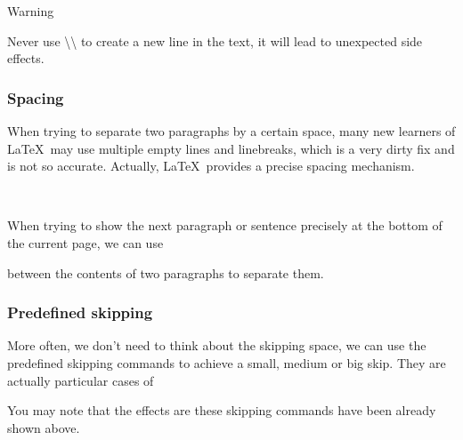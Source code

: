 \begin{frame}{Warning}
    \begin{warning}
        Never use \alert{\textbackslash\textbackslash} to create a new line in the text, it will lead to unexpected side effects.
    \end{warning}
  \end{frame}

\begin{frame}[fragile]
    \frametitle{Spacing}
    When trying to separate two paragraphs by a certain space, many new learners of \LaTeX\ may use multiple empty lines and linebreaks, which is a very dirty fix and is not so accurate. Actually, \LaTeX\ provides a precise spacing mechanism.
    \begin{command}
        \LC{\vspace{space}}\\
        \LC{\vspace*{space}}
    \end{command}
    \pause
    When trying to show the next paragraph or sentence precisely at the bottom of the current page, we can use
    \begin{command}
        \LC{\vfill}
    \end{command}
    between the contents of two paragraphs to separate them.
\end{frame}

\begin{frame}[fragile]
    \frametitle{Predefined skipping}

    More often\footnotemark[1], we don't need to think about the skipping space, we can use the predefined skipping commands to achieve a small, medium or big skip. They are actually particular cases of \LC{\vspace}

    \begin{command}
        \LC{\smallskip}\smallskip

        \LC{\medskip}\medskip

        \LC{\bigskip}\bigskip
    \end{command}

    \pause
    You may note that the effects are these skipping commands have been already shown above.
\end{frame}

